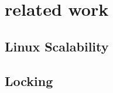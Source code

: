 \section{related work} \label{sec:Background}
\subsection{Linux Scalability}

 


\subsection{Locking}

